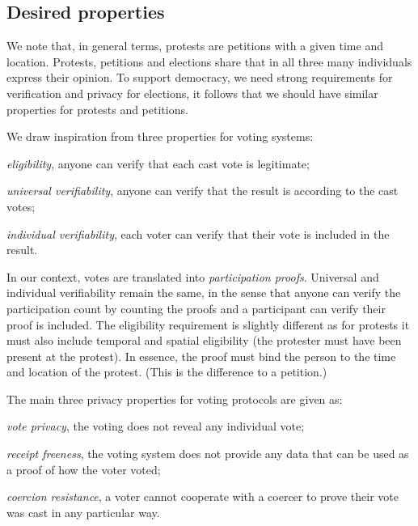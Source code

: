 \subsection{Desired properties}%
\label{desired-properties}

We note that, in general terms, protests are petitions with a given time and 
location.
Protests, petitions and elections share that in all three many individuals 
express their opinion.
To support democracy, we need strong requirements for verification and privacy 
for elections, it follows that we should have similar properties for protests
and petitions.

We draw inspiration from three properties for voting systems:
\begin{enumerate*}
  \item \emph{eligibility}, anyone can verify that each cast vote is 
    legitimate;
  \item \emph{universal verifiability}, anyone can verify that the result is 
    according to the cast votes;
  \item \emph{individual verifiability}, each voter can verify that their vote 
    is included in the result.
\end{enumerate*}
In our context, votes are translated into \emph{participation proofs}.
Universal and individual verifiability remain the same, in the sense that anyone can verify the participation count by counting the proofs and a participant can verify their proof is included.
The eligibility requirement is slightly different as for protests it must also
include temporal %
and spatial eligibility (\ie the protester must have been present at the 
protest).
In essence, the proof must bind the person to the time and location of the protest.
(This is the difference to a petition.)

The main three privacy properties for voting protocols are given as:
\begin{enumerate*}
  \item \emph{vote privacy}, the voting does not reveal any individual vote;
  \item \emph{receipt freeness}, the voting system does not provide any data 
    that can be used as a proof of how the voter voted;
  \item \emph{coercion resistance}, a voter cannot cooperate with a coercer to 
    prove their vote was cast in any particular way.
\end{enumerate*}

